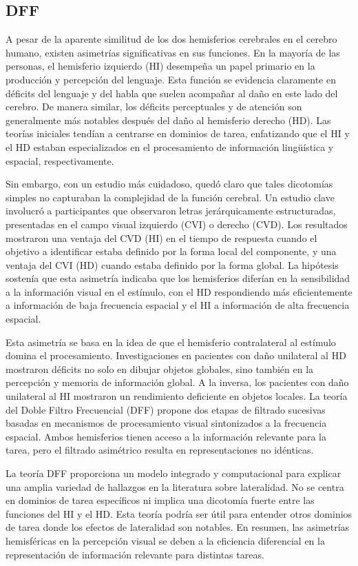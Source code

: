 \documentclass[12pt,oneside]{uhthesis}
\begin{document}
\subsection{DFF}

A pesar de la aparente similitud de los dos hemisferios cerebrales en el cerebro humano, existen asimetrías significativas en sus funciones. En la mayoría de las personas, el hemisferio izquierdo (HI) desempeña un papel primario en la producción y percepción del lenguaje. Esta función se evidencia claramente en déficits del lenguaje y del habla que suelen acompañar al daño en este lado del cerebro. De manera similar, los déficits perceptuales y de atención son generalmente más notables después del daño al hemisferio derecho (HD). Las teorías iniciales tendían a centrarse en dominios de tarea, enfatizando que el HI y el HD estaban especializados en el procesamiento de información lingüística y espacial, respectivamente.

Sin embargo, con un estudio más cuidadoso, quedó claro que tales dicotomías simples no capturaban la complejidad de la función cerebral. Un estudio clave involucró a participantes que observaron letras jerárquicamente estructuradas, presentadas en el campo visual izquierdo (CVI) o derecho (CVD). Los resultados mostraron una ventaja del CVD (HI) en el tiempo de respuesta cuando el objetivo a identificar estaba definido por la forma local del componente, y una ventaja del CVI (HD) cuando estaba definido por la forma global. La hipótesis sostenía que esta asimetría indicaba que los hemisferios diferían en la sensibilidad a la información visual en el estímulo, con el HD respondiendo más eficientemente a información de baja frecuencia espacial y el HI a información de alta frecuencia espacial.

Esta asimetría se basa en la idea de que el hemisferio contralateral al estímulo domina el procesamiento. Investigaciones en pacientes con daño unilateral al HD mostraron déficits no solo en dibujar objetos globales, sino también en la percepción y memoria de información global. A la inversa, los pacientes con daño unilateral al HI mostraron un rendimiento deficiente en objetos locales. La teoría del Doble Filtro Frecuencial (DFF) propone dos etapas de filtrado sucesivas basadas en mecanismos de procesamiento visual sintonizados a la frecuencia espacial. Ambos hemisferios tienen acceso a la información relevante para la tarea, pero el filtrado asimétrico resulta en representaciones no idénticas.

La teoría DFF proporciona un modelo integrado y computacional para explicar una amplia variedad de hallazgos en la literatura sobre lateralidad. No se centra en dominios de tarea específicos ni implica una dicotomía fuerte entre las funciones del HI y el HD. Esta teoría podría ser útil para entender otros dominios de tarea donde los efectos de lateralidad son notables. En resumen, las asimetrías hemisféricas en la percepción visual se deben a la eficiencia diferencial en la representación de información relevante para distintas tareas.
\end{document}
